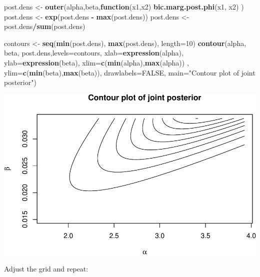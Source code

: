 \documentclass[]{article}
\newenvironment{Shaded}{\begin{snugshade}}{\end{snugshade}}
\newcommand{\KeywordTok}[1]{\textcolor[rgb]{0.13,0.29,0.53}{\textbf{#1}}}
\newcommand{\DataTypeTok}[1]{\textcolor[rgb]{0.13,0.29,0.53}{#1}}
\newcommand{\DecValTok}[1]{\textcolor[rgb]{0.00,0.00,0.81}{#1}}
\newcommand{\StringTok}[1]{\textcolor[rgb]{0.31,0.60,0.02}{#1}}
\newcommand{\OtherTok}[1]{\textcolor[rgb]{0.56,0.35,0.01}{#1}}
\newcommand{\ControlFlowTok}[1]{\textcolor[rgb]{0.13,0.29,0.53}{\textbf{#1}}}
\newcommand{\OperatorTok}[1]{\textcolor[rgb]{0.81,0.36,0.00}{\textbf{#1}}}
\newcommand{\NormalTok}[1]{#1}
\begin{document}
\begin{Shaded}
\begin{Highlighting}[]
\NormalTok{post.dens       <-}\StringTok{  }\KeywordTok{outer}\NormalTok{(alpha,beta,}\ControlFlowTok{function}\NormalTok{(x1,x2) }\KeywordTok{bic.marg.post.phi}\NormalTok{(x1, x2) )}
\NormalTok{post.dens       <-}\StringTok{  }\KeywordTok{exp}\NormalTok{(post.dens }\OperatorTok{-}\StringTok{ }\KeywordTok{max}\NormalTok{(post.dens))}
\NormalTok{post.dens       <-}\StringTok{  }\NormalTok{post.dens}\OperatorTok{/}\KeywordTok{sum}\NormalTok{(post.dens)}



\NormalTok{contours        <-}\StringTok{ }\KeywordTok{seq}\NormalTok{(}\KeywordTok{min}\NormalTok{(post.dens), }\KeywordTok{max}\NormalTok{(post.dens), }\DataTypeTok{length=}\DecValTok{10}\NormalTok{)}
\KeywordTok{contour}\NormalTok{(alpha, beta, post.dens,}\DataTypeTok{levels=}\NormalTok{contours, }
        \DataTypeTok{xlab=}\KeywordTok{expression}\NormalTok{(alpha), }
        \DataTypeTok{ylab=}\KeywordTok{expression}\NormalTok{(beta), }
        \DataTypeTok{xlim=}\KeywordTok{c}\NormalTok{(}\KeywordTok{min}\NormalTok{(alpha),}\KeywordTok{max}\NormalTok{(alpha)) , }
        \DataTypeTok{ylim=}\KeywordTok{c}\NormalTok{(}\KeywordTok{min}\NormalTok{(beta),}\KeywordTok{max}\NormalTok{(beta)), }
        \DataTypeTok{drawlabels=}\OtherTok{FALSE}\NormalTok{, }
        \DataTypeTok{main=}\StringTok{"Contour plot of joint posterior"}\NormalTok{)}
\end{Highlighting}
\end{Shaded}

\includegraphics{Untitled_files/figure-latex/unnamed-chunk-25-1.pdf}

Adjust the grid and repeat:
\end{document}
